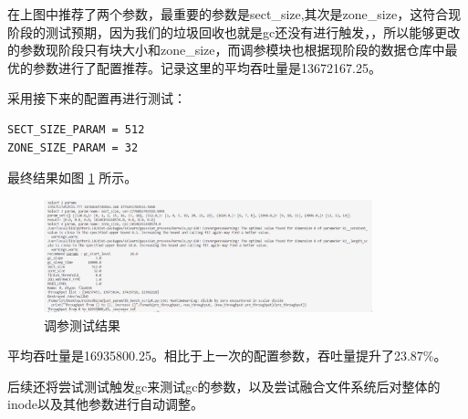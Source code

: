 在上图中推荐了两个参数，最重要的参数是sect\_size,其次是zone\_size，这符合现阶段的测试预期，因为我们的垃圾回收也就是gc还没有进行触发，，所以能够更改的参数现阶段只有块大小和zone\_size，而调参模块也根据现阶段的数据仓库中最优的参数进行了配置推荐。记录这里的平均吞吐量是13672167.25。

采用接下来的配置再进行测试：

\begin{lstlisting}
SECT_SIZE_PARAM = 512
ZONE_SIZE_PARAM = 32
\end{lstlisting}

最终结果如图 \ref{test-turnner3} 所示。

\begin{figure}[htbp]
  \centering
  \includegraphics[width=0.85\textwidth]{fig/turnner3.png}
  \caption{ 调参测试结果 }
  \label{test-turnner3}
\end{figure}

平均吞吐量是16935800.25。相比于上一次的配置参数，吞吐量提升了23.87\%。

后续还将尝试测试触发gc来测试gc的参数，以及尝试融合文件系统后对整体的inode以及其他参数进行自动调整。

